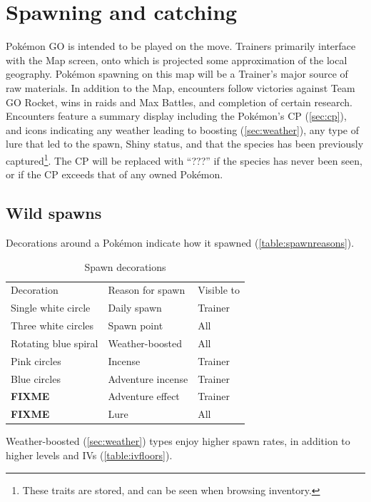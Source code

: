 \chapter{Spawning and catching}
\label{chap:spawn}
Pokémon GO is intended to be played on the move.
Trainers primarily interface with the Map screen, onto which is projected
  some approximation of the local geography.
Pokémon spawning on this map will be a Trainer's major source of raw materials.
In addition to the Map, encounters follow victories against Team GO Rocket,
  wins in raids and Max Battles, and completion of certain research.
Encounters feature a summary display including the Pokémon's CP (\autoref{sec:cp}),
  and icons indicating any weather leading to boosting (\autoref{sec:weather}),
  any type of lure that led to the spawn,
  Shiny status,
  and that the species has been previously captured\footnote{These traits are stored, and can be seen when browsing inventory.}.
The CP will be replaced with ``???'' if the species has never been seen, or if
  the CP exceeds that of any owned Pokémon.

\section{Wild spawns}
\label{sec:spawns}
Decorations around a Pokémon indicate how it spawned (\autoref{table:spawnreasons}).
\begin{table}[ht]
\centering
\begin{tabular}{lll}
  Decoration & Reason for spawn & Visible to\\
\Midrule
  Single white circle & Daily spawn & Trainer\\
  Three white circles & Spawn point & All\\
  Rotating blue spiral & Weather-boosted & All\\
  Pink circles & Incense & Trainer\\
  Blue circles & Adventure incense & Trainer\\
  \textbf{FIXME} & Adventure effect & Trainer\\
  \textbf{FIXME} & Lure & All\\
\end{tabular}
\caption{Spawn decorations}
\label{table:spawnreasons}
\end{table}
Weather-boosted (\autoref{sec:weather}) types enjoy higher spawn rates,
  in addition to higher levels and IVs (\autoref{table:ivfloors}).

